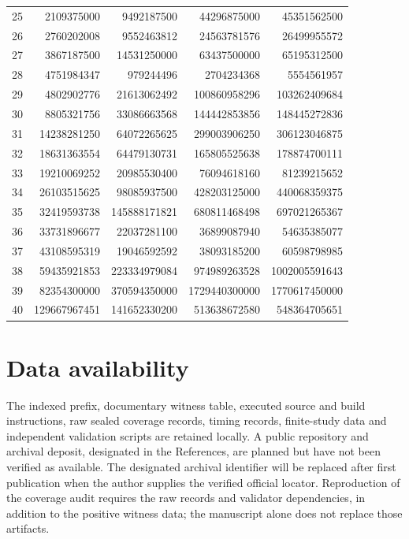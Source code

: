\documentclass[11pt]{article}
\theoremstyle{definition}
\begin{document}
\begin{longtable}{rrrrr}
25 & 2109375000 & 9492187500 & 44296875000 & 45351562500\\
26 & 2760202008 & 9552463812 & 24563781576 & 26499955572\\
27 & 3867187500 & 14531250000 & 63437500000 & 65195312500\\
28 & 4751984347 & 979244496 & 2704234368 & 5554561957\\
29 & 4802902776 & 21613062492 & 100860958296 & 103262409684\\
30 & 8805321756 & 33086663568 & 144442853856 & 148445272836\\
31 & 14238281250 & 64072265625 & 299003906250 & 306123046875\\
32 & 18631363554 & 64479130731 & 165805525638 & 178874700111\\
33 & 19210069252 & 20985530400 & 76094618160 & 81239215652\\
34 & 26103515625 & 98085937500 & 428203125000 & 440068359375\\
35 & 32419593738 & 145888171821 & 680811468498 & 697021265367\\
36 & 33731896677 & 22037281100 & 36899087940 & 54635385077\\
37 & 43108595319 & 19046592592 & 38093185200 & 60598798985\\
38 & 59435921853 & 223334979084 & 974989263528 & 1002005591643\\
39 & 82354300000 & 370594350000 & 1729440300000 & 1770617450000\\
40 & 129667967451 & 141652330200 & 513638672580 & 548364705651\\
\end{longtable}
\endgroup

\section*{Data availability}
The indexed prefix, documentary witness table, executed source and build
instructions, raw sealed coverage records, timing records, finite-study
data and independent validation scripts are retained locally. A public
repository and archival deposit, designated in the References, are planned
but have not been verified as available. The designated archival identifier
will be replaced after first publication when the author supplies the
verified official locator. Reproduction of the coverage audit requires the raw records
and validator dependencies, in addition to the positive witness data;
the manuscript alone does not replace those artifacts.
\end{document}
